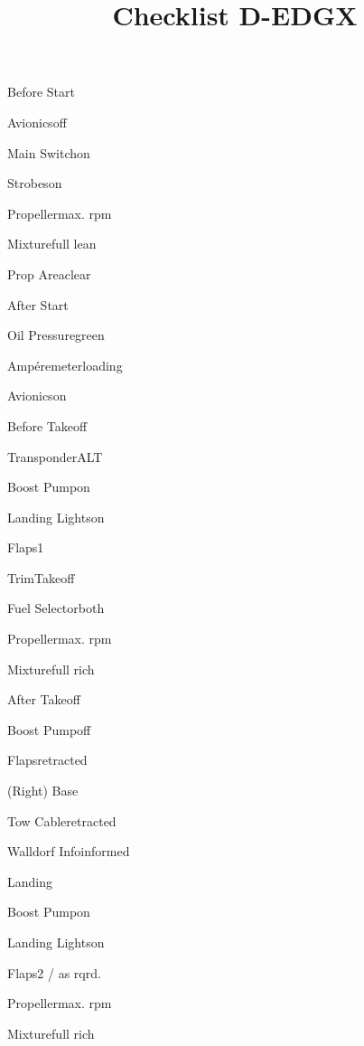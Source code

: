 \def\papersize{6}




\title{Checklist D-EDGX}

\begin{checklist}{Before Start}
  \item{Avionics}{off}
  \item{Main Switch}{on}
  \item{Strobes}{on}
  \item{Propeller}{max. rpm}
  \item{Mixture}{full lean}
  \item{Prop Area}{clear}
\end{checklist}

\begin{checklist}{After Start}
  \item{Oil Pressure}{green}
  \item{Ampéremeter}{loading}
  \item{Avionics}{on}
\end{checklist}

\begin{checklist}{Before Takeoff}
  \item{Transponder}{ALT}
  \item{Boost Pump}{on}
  \item{Landing Lights}{on}
  \item{Flaps}{1}
  \item{Trim}{Takeoff}
  \item{Fuel Selector}{both}
  \item{Propeller}{max. rpm}
  \item{Mixture}{full rich}
\end{checklist}

\begin{checklist}{After Takeoff}
  \item{Boost Pump}{off}
  \item{Flaps}{retracted}
\end{checklist}

\begin{checklist}{(Right) Base}
  \item{Tow Cable}{retracted}
  \item{Walldorf Info}{informed}
\end{checklist}

\begin{checklist}{Landing}
  \item{Boost Pump}{on}
  \item{Landing Lights}{on}
  \item{Flaps}{2 / as rqrd.}
  \item{Propeller}{max. rpm}
  \item{Mixture}{full rich}
\end{checklist}

